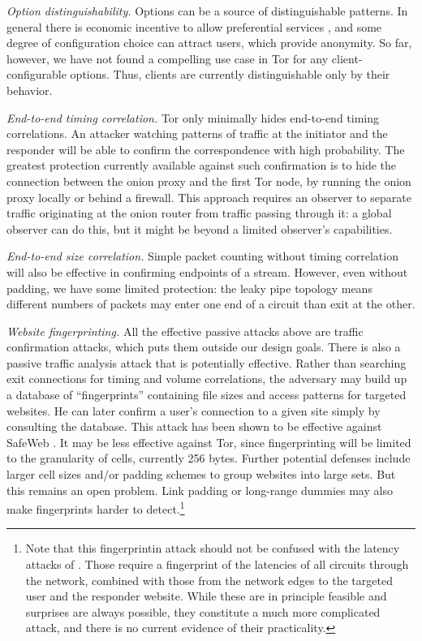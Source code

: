 \documentclass[times,10pt,twocolumn]{article}
\begin{document}
\emph{Option distinguishability.} Options can be a
source of distinguishable patterns. In general there is economic
incentive to allow preferential services \cite{econymics}, and some
degree of configuration choice can attract users, which
provide anonymity.  So far, however, we have
not found a compelling use case in Tor for any client-configurable
options.  Thus, clients are currently distinguishable only by their
behavior.
  
\emph{End-to-end timing correlation.}  Tor only minimally hides
end-to-end timing correlations. An attacker watching patterns of
traffic at the initiator and the responder will be
able to confirm the correspondence with high probability. The
greatest protection currently available against such confirmation is to hide
the connection between the onion proxy and the first Tor node,
by running the onion proxy locally or 
behind a firewall.  This approach
requires an observer to separate traffic originating at the onion
router from traffic passing through it: a global observer can do this,
but it might be beyond a limited observer's capabilities.
  
\emph{End-to-end size correlation.} Simple packet counting
without timing correlation will also be effective in confirming
endpoints of a stream. However, even without padding, we have some
limited protection: the leaky pipe topology means different numbers
of packets may enter one end of a circuit than exit at the other.
  
\emph{Website fingerprinting.} All the effective passive
attacks above are traffic confirmation attacks,
which puts them outside our design goals. There is also
a passive traffic analysis attack that is potentially effective.
Rather than searching exit connections for timing and volume
correlations, the adversary may build up a database of
``fingerprints'' containing file sizes and access patterns for 
targeted websites. He can later confirm a user's connection to a given
site simply by consulting the database. This attack has
been shown to be effective against SafeWeb \cite{hintz-pet02}.
It may be less effective against Tor, since
fingerprinting will be limited to
the granularity of cells, currently 256 bytes.  Further potential
defenses include 
larger cell sizes and/or padding schemes to group websites
into large sets. But this remains an open problem.  Link
padding or long-range dummies may also make fingerprints harder to
detect.\footnote{Note that
this fingerprintin attack should not be confused with the latency attacks
of \cite{back01}. Those require a fingerprint of the latencies of
all circuits through the network, combined with those from the
network edges to the targeted user and the responder website. While
these are in principle feasible and surprises are always possible,
they constitute a much more complicated attack, and there is no
current evidence of their practicality.}\\
\end{document}
